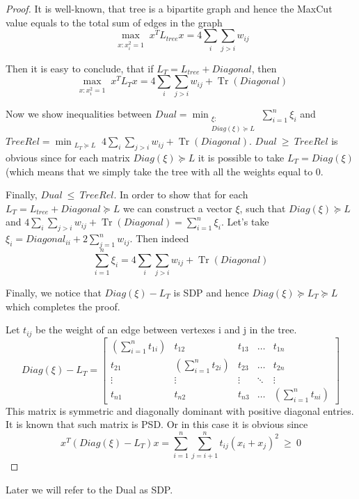 \documentclass{article}
\DeclareMathOperator{\tr}{Tr}
\renewcommand{\le}{\ \leqslant\ }
\renewcommand{\ge}{\ \geqslant\ }
\begin{document}




\begin{proof}
It is well-known, that tree is a bipartite graph and hence the MaxCut value equals to the total sum of edges in the graph $$\max_{\substack{x: x_i^2 = 1}} x^T L_{tree} x = 4 \sum_{i} \sum_{j > i} w_{ij}$$

Then it is easy to conclude, that if $L_T = L_{tree} + Diagonal$, then 
$$\max_{\substack{x: x_i^2 = 1}} x^T L_T x = 4 \sum_{i} \sum_{j > i} w_{ij} + \tr(Diagonal)$$

Now we show inequalities between $Dual = \min_{\substack{\xi: \\  Diag(\xi) \succeq L}} \sum_{i=1}^n{\xi_i}$ and $TreeRel = \min_{\substack{L_T \succeq L}} 4 \sum_{i} \sum_{j > i} w_{ij} + \tr(Diagonal)$.
$Dual \ge TreeRel$ is obvious since for each matrix $Diag(\xi) \succeq L$ it is possible to take $L_T = Diag(\xi)$ (which means that we simply take the tree with all the weights equal to 0.

Finally, $Dual \le TreeRel$. In order to show that for each $L_T = L_{tree} + Diagonal \succeq L$ we can construct a vector $\xi$, such that $Diag(\xi) \succeq L$ and $4 \sum_{i} \sum_{j > i} w_{ij} + \tr(Diagonal) = \sum_{i=1}^n{\xi_i}$. Let's take $\xi_i = Diagonal_{ii} + 2 \sum_{j=1}^n w_{ij}$. Then indeed $$\sum_{i=1}^n{\xi_i} = 4 \sum_{i} \sum_{j > i} w_{ij} + \tr(Diagonal)$$ 

Finally, we notice that $Diag(\xi) - L_T$ is SDP and hence $Diag(\xi) \succeq L_T \succeq L$ which completes the proof.

Let $t_{ij}$ be the weight of an edge between vertexes i and j in the tree.  $$Diag(\xi) - L_T = \begin{bmatrix}
    (\sum_{i = 1}^n t_{1i}) & t_{12} & t_{13} & \dots  & t_{1n} \\
    t_{21} & (\sum_{i = 1}^n t_{2i}) & t_{23} & \dots  & t_{2n} \\
    \vdots & \vdots & \vdots & \ddots & \vdots \\
    t_{n1} & t_{n2} & t_{n3} & \dots  & (\sum_{i = 1}^n t_{ni})
\end{bmatrix}$$
This matrix is symmetric and diagonally dominant with positive diagonal entries. It is known that such matrix is PSD. Or in this case it is obvious since $$x^T (Diag(\xi) - L_T) x = \sum_{i = 1}^n \sum_{j = i + 1}^n t_{ij} (x_{i} + x_{j})^2 \ge 0$$
\end{proof}
Later we will refer to the Dual as SDP.
\end{document}
